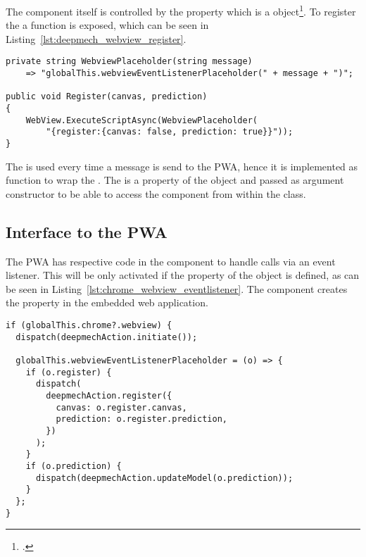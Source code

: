 The  component itself is controlled by the  property which is a  object\footnote{.}.
To register the  a  function is exposed, which can be seen in Listing~\ref{lst:deepmech_webview_register}.

\begin{lstlisting}[label={lst:deepmech_webview_register}, caption={DeepmechWebView Register function}]
private string WebviewPlaceholder(string message)
    => "globalThis.webviewEventListenerPlaceholder(" + message + ")";

public void Register(canvas, prediction)
{
    WebView.ExecuteScriptAsync(WebviewPlaceholder(
        "{register:{canvas: false, prediction: true}}"));
}
\end{lstlisting}

The  is used every time a message is send to the PWA, hence it is implemented as function to wrap the .
The  is a property of the  object and passed as argument constructor to be able to access the  component from within the class.

\subsection{Interface to the PWA} \label{ch:interface_to_the_pwa}

The PWA has respective code in the  component to handle calls via an event listener.
This will be only activated if the  property of the  object is defined, as can be seen in Listing~\ref{lst:chrome_webview_eventlistener}.
The  component creates the  property in the embedded web application.

\begin{lstlisting}[label={lst:chrome_webview_eventlistener}, caption={PWA event-handler for the chrome webview}]
if (globalThis.chrome?.webview) {
  dispatch(deepmechAction.initiate());

  globalThis.webviewEventListenerPlaceholder = (o) => {
    if (o.register) {
      dispatch(
        deepmechAction.register({
          canvas: o.register.canvas,
          prediction: o.register.prediction,
        })
      );
    }
    if (o.prediction) {
      dispatch(deepmechAction.updateModel(o.prediction));
    }
  };
}
\end{lstlisting}


